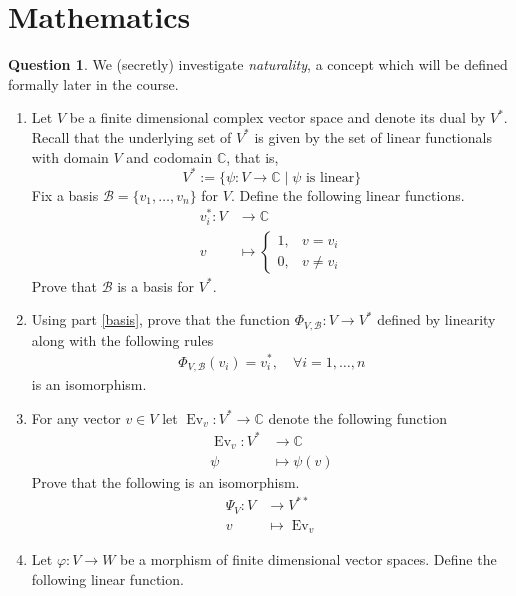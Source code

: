 \documentclass[12pt]{article}
\theoremstyle{plain}
\theoremstyle{definition}
\newtheorem{question}[thm]{Question}
\newcommand{\bb}[1]{\mathbb{#1}}
\newcommand{\scr}[1]{\mathscr{#1}}
\newcommand{\lto}{\longrightarrow}
\begin{document}
	\section{Mathematics}
	\begin{question} We (secretly) investigate \emph{naturality}, a concept which will be defined formally later in the course.
		\begin{enumerate}
			\item\label{basis} Let $V$ be a finite dimensional complex vector space and denote its dual by $V^\ast$. Recall that the underlying set of $V^\ast$ is given by the set of linear functionals with domain $V$ and codomain $\bb{C}$, that is,
			\begin{equation}
				V^\ast := \{ \psi: V \lto \bb{C} \mid \psi\text{ is linear} \}
				\end{equation}
			Fix a basis $\scr{B} = \{ v_1, \ldots, v_n \}$ for $V$. Define the following linear functions.
			\begin{align*}
				v_i^\ast: V &\lto \bb{C}\\
				v &\longmapsto
				\begin{cases}
					1,& v = v_i\\
					0,& v \neq v_i
				\end{cases}
			\end{align*}
		Prove that $\scr{B}$ is a basis for $V^\ast$.
		\item Using part \ref{basis}, prove that the function $\Phi_{V, \scr{B}}: V \lto V^\ast$ defined by linearity along with the following rules
		\begin{align}
			\Phi_{V,\scr{B}}(v_i) = v_i^\ast,\quad \forall i = 1,\ldots, n
			\end{align}
		is an isomorphism.
		\item For any vector $v \in V$ let $\operatorname{Ev}_v: V^\ast \lto \bb{C}$ denote the following function
		\begin{align*}
			\operatorname{Ev}_v: V^\ast &\lto \bb{C}\\
			\psi &\longmapsto \psi(v)
		\end{align*}
		Prove that the following is an isomorphism.
		\begin{align*}
			\Psi_V: V &\lto V^{\ast\ast}\\
			v &\longmapsto \operatorname{Ev}_v
		\end{align*}
		\item Let $\varphi: V \lto W$ be a morphism of finite dimensional vector spaces. Define the following linear function.

\end{enumerate}
\end{question}
\end{document}
